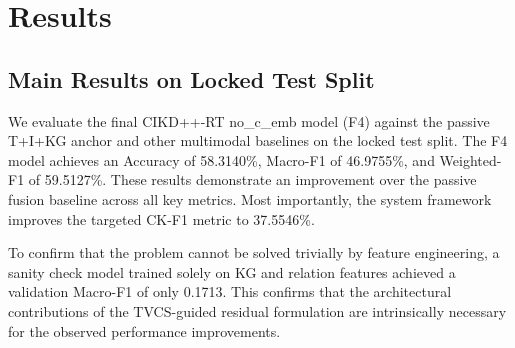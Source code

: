 \section{Results}

\subsection{Main Results on Locked Test Split}
We evaluate the final CIKD++-RT no\_c\_emb model (F4) against the passive T+I+KG anchor and other multimodal baselines on the locked test split. The F4 model achieves an Accuracy of 58.3140\%, Macro-F1 of 46.9755\%, and Weighted-F1 of 59.5127\%. These results demonstrate an improvement over the passive fusion baseline across all key metrics. Most importantly, the system framework improves the targeted CK-F1 metric to 37.5546\%.

To confirm that the problem cannot be solved trivially by feature engineering, a sanity check model trained solely on KG and relation features achieved a validation Macro-F1 of only 0.1713. This confirms that the architectural contributions of the TVCS-guided residual formulation are intrinsically necessary for the observed performance improvements.

\begin{table}[!t]
\centering
\caption{Baseline and Final Model Metrics}
\end{table}

